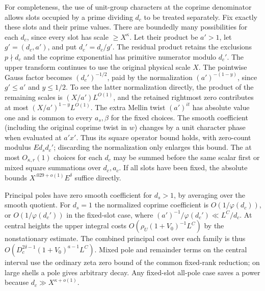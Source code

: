 \documentclass[11pt,a4paper]{article}
\theoremstyle{paperplain}
\numberwithin{equation}{section}
\begin{document}
For completeness, the use of unit-group characters at the coprime
denominator allows slots occupied by a prime dividing $d_c$ to be
treated separately. Fix exactly these slots and their prime values.
There are boundedly many possibilities for each $d_c$, since
every slot has scale $\ge X^\kappa$. Let their product be $a'>1$,
let $g'=(d_c,a')$, and put $d_c'=d_c/g'$. The residual product
retains the exclusions $p\nmid d_c$ and the coprime exponential
has primitive numerator modulo $d_c'$. The upper transform
continues to use the original physical scale $X$. The pointwise
Gauss factor becomes $(d_c')^{-1/2}$, paid by the normalization
$(a')^{-(1-y)}$, since $g'\le a'$ and $y\le1/2$.
To see the latter normalization directly, the product of the remaining
scales is $(X/a')L^{O(1)}$, and the retained rightmost zero contributes
at most $(X/a')^{1-y}L^{O(1)}$. The extra Mellin twist
$(a')^{it}$ has absolute value one and is common to every $a_s,\beta$
for the fixed choices. The smooth coefficient (including the original
coprime twist in $w$) changes by a unit character phase when evaluated
at $a'x'$. Thus its square operator bound holds, with zero-count
modulus $Ed_sd_c'$; discarding the normalization only enlarges this
bound. The at most $O_{\kappa,r}(1)$ choices for each $d_c$ may be
summed before the same scalar first or mixed square summations over
$d_c,a_c$. If all slots have been fixed, the
absolute bounds $X^{.029+o(1)}E^\delta$ suffice directly.

Principal poles have zero smooth coefficient for $d_s>1$,
by averaging over the smooth quotient. For $d_s=1$ the normalized
coprime coefficient is $O(1/\varphi(d_c))$, or
$O(1/\varphi(d_c'))$ in the fixed-slot case, where
$(a')^{-1}/\varphi(d_c')\ll L^C/d_c$. At central heights the
upper integral costs $O(\rho_U(1+V_0)^{-1}L^C)$ by the
nonstationary estimate. The combined principal cost over each
family is thus $O(D_c^{2\delta-1}(1+V_0)^{a-1}L^C)$.
Mixed pole and remainder terms on the central interval use the
ordinary zeta zero bound of the common fixed-rank reduction;
on large shells a pole gives arbitrary decay. Any fixed-slot
all-pole case saves a power because $d_c\gg X^{\kappa+o(1)}$.
\end{document}
